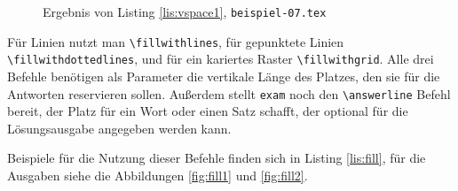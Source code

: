 \begin{figure}[b]
\caption{Ergebnis von Listing \ref{lis:vspace1}, \texttt{beispiel-07.tex}}\label{fig:vspace1}
\end{figure}

Für Linien nutzt man \texttt{\textbackslash fillwithlines}, für gepunktete Linien \texttt{\textbackslash fillwithdottedlines}, und für ein kariertes Raster \texttt{\textbackslash fillwithgrid}. Alle drei Befehle benötigen als Parameter die vertikale Länge des Platzes, den sie für die Antworten reservieren sollen. Außerdem stellt \texttt{exam} noch den \texttt{\textbackslash answerline} Befehl bereit, der Platz für ein Wort oder einen Satz schafft, der optional für die Lösungsausgabe angegeben werden kann.

Beispiele für die Nutzung dieser Befehle finden sich in Listing \ref{lis:fill}, für die Ausgaben siehe die Abbildungen \ref{fig:fill1} und \ref{fig:fill2}. 

